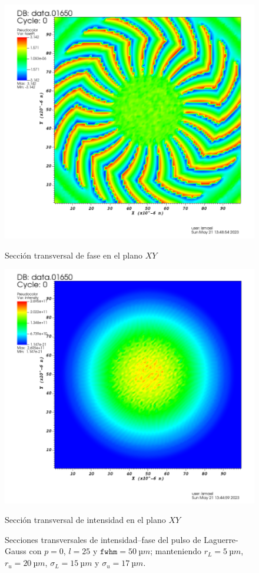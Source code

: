 \begin{figure}[htbp]
  \centering
  \begin{subcaptionblock}{.4\textwidth}
    \centering
    \includegraphics[width=\textwidth]{Figuras/anx_oamfs_0.png}
    \caption*{Sección transversal de fase en el plano $XY$}
  \end{subcaptionblock}
  \begin{subcaptionblock}{.4\textwidth}
    \centering
    \includegraphics[width=\textwidth]{Figuras/anx_oamint_0.png}
    \caption*{Sección transversal de intensidad en el plano $XY$}
  \end{subcaptionblock}
   \caption*{Secciones transversales de intensidad--fase del pulso de Laguerre-Gauss con $p=0$, $l=25$ y $\texttt{fwhm}=\qty{50}{µm}$; manteniendo $r_{L}=\qty{5}{µm}$, $r_{u}=\qty{20}{µm}$, $\sigma_{L}=\qty{15}{µm}$ y $\sigma_{u}=\qty{17}{µm}$.}
\end{figure}
